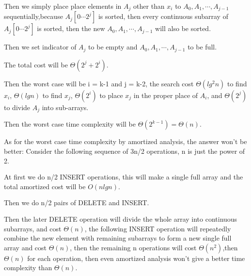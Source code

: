\documentclass[oneside]{homework} %
\begin{document}
Then we simply place place elements in $A_{j}$ other than $x_{i}$ to $A_{0},A_{1},\cdots,A_{j-1}$ sequentially,because $A_{j}[0\cdots 2^{j}]$ is sorted, then every continuous subarray of $A_{j}[0\cdots 2^{j}]$ is sorted, then the new $A_{0},A_{1},\cdots,A_{j-1}$ will also be sorted.

Then we set indicator of $A_{j}$ to be empty and $A_{0},A_{1},\cdots,A_{j-1}$ to be full. 

The total cost will be $\Theta(2^{j}+2^{i})$.

Then the worst case will be i = k-1 and j = k-2, the search cost $\Theta(lg^{2}n)$ to find $x_{i}$, $\Theta(lgn)$ to find $x_{j}$, $\Theta(2^{i})$ to place $x_{j}$ in the proper place of $A_{i}$, and $\Theta(2^{j}) $ to divide $A_{j}$ into sub-arrays.

Then the worst case time complexity will be $\Theta(2^{k-1}) = \Theta(n)$.

As for the worst case time complexity by amortized analysis, the answer won't be better:
Consider the following sequence of 3n/2 operations, n is just the power of 2.

At first we do n/2 INSERT operations, this will make a single full array and the total amortized  cost will be $O(nlgn)$. 

Then we do n/2 pairs of DELETE and INSERT. 

Then the later DELETE operation will divide the whole array into continuous subarrays, and cost $\Theta(n)$, the following INSERT operation will repeatedly combine the new element with remaining subarrays to form a new single full array and cost $\Theta(n)$, then the remaining n operations will cost $\Theta(n^2)$,then $\Theta(n)$ for each operation, then even amortized analysis won't give a better time complexity than $\Theta(n)$.
\end{document}
